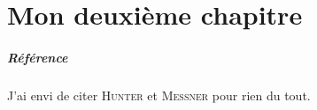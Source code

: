 \chapter{Mon deuxième chapitre}

\blindtext[42]

\paragraph{Référence\\\indent}
J'ai envi de citer \textsc{Hunter} \cite{hunter_1978_papermaking} et \textsc{Messner} \cite{messner_1994_biopulping} pour rien du tout.
